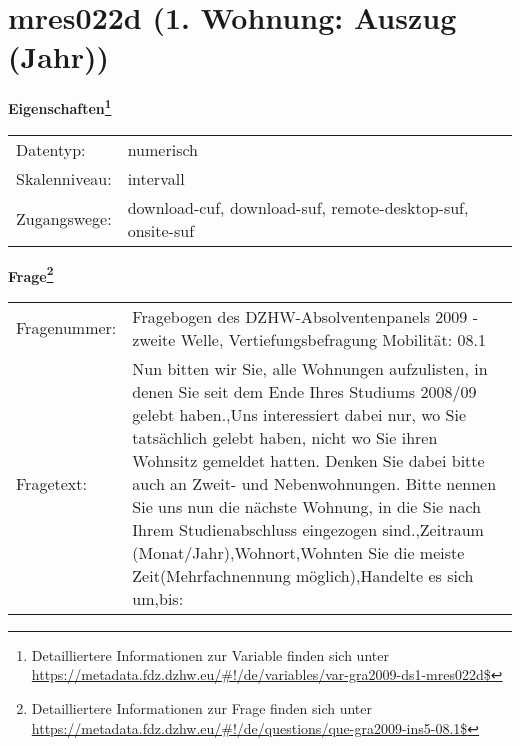 
    \setcounter{footnote}{0}

    \vspace*{-1.8cm}
	\section{mres022d (1. Wohnung: Auszug (Jahr))}
	\label{section:mres022d}



    \vspace*{0.5cm}
    \noindent\textbf{Eigenschaften\footnote{Detailliertere Informationen zur Variable finden sich unter
		\url{https://metadata.fdz.dzhw.eu/\#!/de/variables/var-gra2009-ds1-mres022d$}}}\\
	\begin{tabularx}{\hsize}{@{}lX}
	Datentyp: & numerisch \\
	Skalenniveau: & intervall \\
	Zugangswege: &
	  download-cuf, 
	  download-suf, 
	  remote-desktop-suf, 
	  onsite-suf
 \\
    \end{tabularx}



				\vspace*{0.5cm}
                \noindent\textbf{Frage\footnote{Detailliertere Informationen zur Frage finden sich unter
		              \url{https://metadata.fdz.dzhw.eu/\#!/de/questions/que-gra2009-ins5-08.1$}}}\\
				\begin{tabularx}{\hsize}{@{}lX}
					Fragenummer: &
					  Fragebogen des DZHW-Absolventenpanels 2009 - zweite Welle, Vertiefungsbefragung Mobilität:
					  08.1
 \\
					Fragetext: & Nun bitten wir Sie, alle Wohnungen aufzulisten, in denen Sie seit dem Ende Ihres Studiums 2008/09 gelebt haben.,Uns interessiert dabei nur, wo Sie tatsächlich gelebt haben, nicht wo Sie ihren Wohnsitz gemeldet hatten. Denken Sie dabei bitte auch an Zweit- und Nebenwohnungen. Bitte nennen Sie uns nun die nächste Wohnung, in die Sie nach Ihrem Studienabschluss eingezogen sind.,Zeitraum (Monat/Jahr),Wohnort,Wohnten Sie die meiste Zeit(Mehrfachnennung möglich),Handelte es sich um,bis: \\
				\end{tabularx}





